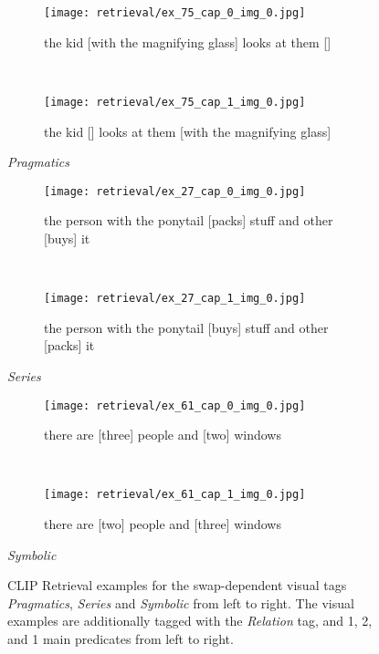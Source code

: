 \begin{figure}[ht]
\centering
    \begin{minipage}{.30\textwidth}
        \begin{subfigure}{\textwidth}
        \centering
        \texttt{[image: retrieval/ex\_75\_cap\_0\_img\_0.jpg]}
        \caption{the kid [with the magnifying glass] looks at them []}
        \end{subfigure}\\
        \begin{subfigure}{\textwidth}
        \centering
        \texttt{[image: retrieval/ex\_75\_cap\_1\_img\_0.jpg]}
        \caption{the kid [] looks at them [with the magnifying glass]}
        \end{subfigure}%
        \caption*{\textit{Pragmatics}}
    \end{minipage}
    \hfill
    \begin{minipage}{.30\textwidth}
        \begin{subfigure}{\textwidth}
        \centering
        \texttt{[image: retrieval/ex\_27\_cap\_0\_img\_0.jpg]}
        \caption{the person with the ponytail [packs] stuff and other [buys] it}
        \end{subfigure}\\
        \begin{subfigure}{\textwidth}
        \centering
        \texttt{[image: retrieval/ex\_27\_cap\_1\_img\_0.jpg]}
        \caption{the person with the ponytail [buys] stuff and other [packs] it}
        \end{subfigure}%
        \caption*{\textit{Series}}
    \end{minipage}
    \hfill
    \begin{minipage}{.30\textwidth}
        \begin{subfigure}{\textwidth}
        \centering
        \texttt{[image: retrieval/ex\_61\_cap\_0\_img\_0.jpg]}
        \caption{there are [three] people and [two] windows}
        \end{subfigure}\\
        \begin{subfigure}{\textwidth}
        \centering
        \texttt{[image: retrieval/ex\_61\_cap\_1\_img\_0.jpg]}
        \caption{there are [two] people and [three] windows}
        \end{subfigure}%
        \caption*{\textit{Symbolic}}
    \end{minipage}
    \caption{CLIP Retrieval examples for the swap-dependent visual tags \textit{Pragmatics}, \textit{Series} and \textit{Symbolic} from left to right. The visual examples are additionally tagged with the \textit{Relation} tag, and 1, 2, and 1 main predicates from left to right.}
    \label{fig:retrieval-examples-visual}
\end{figure}